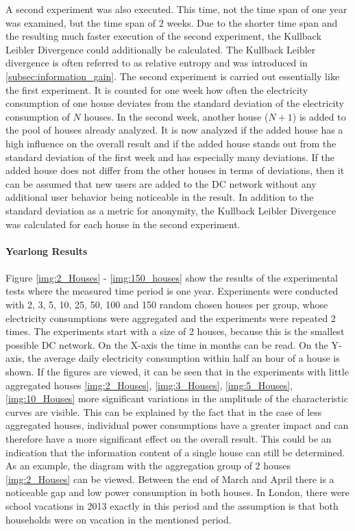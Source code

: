 A second experiment was also executed. This time, not the time span of one year was examined, but the time span of 2 weeks. Due to the shorter time span and the resulting much faster execution of the second experiment, the Kullback Leibler Divergence could additionally be calculated. 
The Kullback Leibler divergence is often referred to as relative entropy and was introduced in \ref{subsec:information_gain}.
The second experiment is carried out essentially like the first experiment. It is counted for one week how often the electricity consumption of one house deviates from the standard deviation of the electricity consumption of $N$ houses. In the second week, another house ($N+1$) is added to the pool of houses already analyzed. It is now analyzed if the added house has a high influence on the overall result and if the added house stands out from the standard deviation of the first week and has especially many deviations. If the added house does not differ from the other houses in terms of deviations, then it can be assumed that new users are added to the DC network without any additional user behavior being noticeable in the result. In addition to the standard deviation as a metric for anonymity, the Kullback Leibler Divergence was calculated for each house in the second experiment. 
\\
\\
\textbf{Yearlong Results}
\\
\\
Figure \ref{img:2_Houses} - \ref{img:150_houses} show the results of the experimental tests where the measured time period is one year. Experiments were conducted with 2, 3, 5, 10, 25, 50, 100 and 150 random chosen houses per group, whose electricity consumptions were aggregated and the experiments were repeated 2 times. The experiments start with a size of 2 houses, because this is the smallest possible DC network. On the X-axis the time in months can be read. On the Y-axis, the average daily electricity consumption within half an hour of a house is shown. If the figures are viewed, it can be seen that in the experiments with little aggregated houses \ref{img:2_Houses}, \ref{img:3_Houses}, \ref{img:5_Houses}, \ref{img:10_Houses} more significant variations in the amplitude of the characteristic curves are visible. This can be explained by the fact that in the case of less aggregated houses, individual power consumptions have a greater impact and can therefore have a more significant effect on the overall result. This could be an indication that the information content of a single house can still be determined. As an example, the diagram  with the aggregation group of 2 houses \ref{img:2_Houses} can be viewed. Between the end of March and April there is a noticeable gap and low power consumption in both houses. In London, there were school vacations in 2013 exactly in this period and the assumption is that both households were on vacation in the mentioned period.\\
